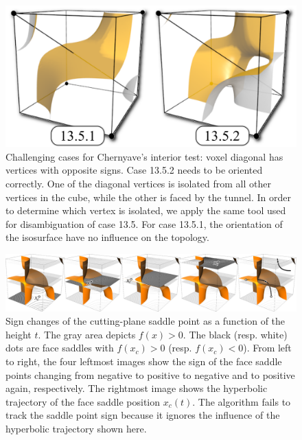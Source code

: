 \begin{figure}[b]
     \centering
     \includegraphics[width=0.6\linewidth]{chapter4/figures/case-13.png}
     \caption{Challenging cases for Chernyave's interior test: voxel diagonal has vertices with opposite signs. Case 13.5.2 needs to be oriented correctly. One of the diagonal vertices is isolated from all other vertices in the cube, while the other is faced by the tunnel. In order to determine which vertex is isolated, we apply the same tool used for disambiguation of case 13.5. For case 13.5.1, the orientation of the isosurface have no influence on the topology. }
     \label{fig:case13}
\end{figure}


\begin{figure}[b]
     \centering
     \includegraphics[width=0.99\linewidth]{chapter4/figures/case13/case13.png}
     \caption{Sign changes of the cutting-plane saddle point as a function of the height $t$. The gray area depicts $f(x) > 0$. The black (resp. white) dots are face saddles with $f(x_c) > 0$ (resp. $f(x_c) < 0$). From left to right, the four leftmost images show the sign of the face saddle points changing from negative to positive to negative and to positive again, respectively. The rightmost image shows the  hyperbolic trajectory of the face saddle position $x_c(t)$. The \mc{} algorithm fails to track the saddle point sign because it ignores the influence of the hyperbolic trajectory shown here. }
     \label{fig:case13saddlesigns}
\end{figure}

